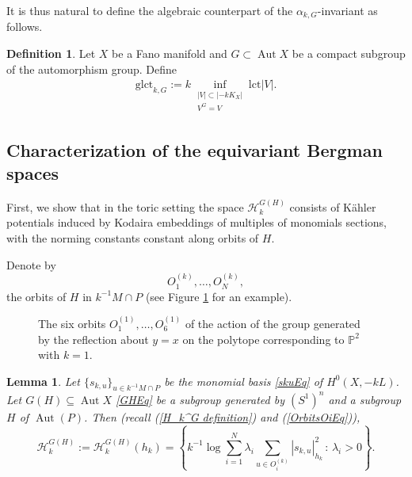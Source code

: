 \documentclass{article}
\newcommand\cH{{\mathcal H}}
\newcommand{\lct}{\mathrm{lct}}
\newcommand{\glct}{\mathrm{glct}}
\newcommand{\PP}{{\mathbb P}}
\renewcommand{\>}{\rightarrow}
\DeclareMathOperator{\Aut}{Aut}
\theoremstyle{plain}
\newtheorem{lemma}[theorem]{Lemma}
\theoremstyle{definition}
\newtheorem{definition}[theorem]{Definition}
\def\K{K\"ahler }
\newcommand{\beq}{\begin{equation}}
\newcommand{\eeq}{\end{equation}}
\newcommand{\blem}{\begin{lemma}}
\newcommand{\elem}{\end{lemma}}
\def\lb#1{\label{#1}}
\begin{document}
            
    It is thus natural to define the algebraic counterpart of the $\alpha_{k,G}$-invariant 
    as follows.
    \begin{definition}
    \lb{glctkDef}
        Let $X$ be a Fano manifold and $G\subset\Aut X$ be a compact subgroup of the automorphism group. Define
    \begin{align}
    \label{alg alpha_k,G}
        \glct_{k,G}
        :=k\inf_{\substack{|V|\subset|-kK_X|\\ V^G=V}}\lct%
        |V|.
    \end{align}
    \end{definition}


\subsection{Characterization of the equivariant Bergman spaces}
\lb{BergmanSubSec}


First, we show that in the toric setting the space $\cH_k^{G(H)}$
consists of \K potentials induced by Kodaira embeddings of multiples of 
monomials sections, with the norming constants constant along orbits
of $H$.

Denote by 
\beq
\lb{OrbitsOiEq}
O_1^{(k)},\ldots,O_N^{(k)},
\eeq
the orbits of $H$ in $k^{-1}M\cap P$
(see Figure \ref{P2figure} for an example).

\begin{figure}
        \centering
        \caption{The six orbits $O_1^{(1)},\ldots,O_6^{(1)}$ of the action of the group generated by the reflection about $y=x$ on the polytope corresponding to $\PP^2$ with $k=1$.}\lb{P2figure}
    \end{figure}


\blem
\lb{HkGHtoricLem}
Let $\{s_{k,u}\}_{u\in k^{-1}M\cap P}$ be
the monomial basis \eqref{skuEq} of $H^0(X,-kL)$.
Let $G(H)\subseteq\Aut X$ \eqref{GHEq} be a subgroup generated by $(S^1)^n$ and a subgroup $H$ of $\Aut(P)$. 
Then (recall (\ref{H_k^G definition}) and (\ref{OrbitsOiEq})),
$$
\cH_k^{G(H)}:=
\cH_k^{G(H)}(h_k)=
\left\{{k}^{-1}\log\sum_{i=1}^N\lambda_i\sum_{u\in O_i^{(k)}}|s_{k,u}|_{h_k}^2\,
:\, \lambda_i>0\right\}.
$$
\elem
\end{document}

